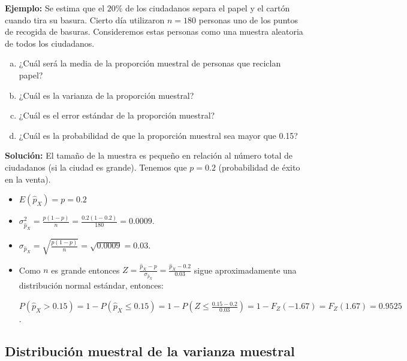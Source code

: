 \begin{frame}
     \textbf{Ejemplo:}
 Se estima que el $20\%$ de los
    ciudadanos  separa el papel y el cartón cuando tira su basura. Cierto día
    utilizaron $n=180$ personas  uno de los puntos de recogida de basuras. Consideremos  estas personas como
    una muestra aleatoria de todos los ciudadanos.
        \begin{enumerate}[a)]
        \item ¿Cuál será la media de la proporción muestral de personas
        que reciclan papel?
        \item ¿Cuál es la varianza de la proporción muestral?
        \item ¿Cuál es el error estándar de la proporción muestral?
        \item ¿Cuál es la probabilidad de que la proporción muestral sea
        mayor que 0.15?
        \end{enumerate}
\end{frame}

\begin{frame}
   \textbf{Solución:}
    El tamaño de la muestra es pequeño en relación al
    número total de ciudadanos (si la ciudad es grande). Tenemos que $p=0.2$ (probabilidad
    de éxito en la venta).
\begin{itemize}
  \item $E(\hat{p}_{X})=p=0.2$

  \item $\sigma_{\hat{p}_{X}}^2= \frac{ p(1-p)}{n}=\frac{0.2
    (1-0.2)}{180}=0.0009$.
  \item $\sigma_{\hat{p}_{X}}=\sqrt{\frac{ p(1-p)}{n}}=\sqrt{0.0009}=0.03$.
    \item Como $n$  es grande entonces
    $Z=\frac{\hat{p}_{X}-p}{\sigma_{\hat{p}_{X}}}=\frac{\hat{p}_{X}-0.2}{0.03}$
 sigue aproximadamente una distribución normal estándar, entonces:

 $P(\hat{p}_{X}>0.15)=1-P(\hat{p}_{X}\leq 0.15)= 1-P(Z\leq
 \frac{0.15-0.2}{0.03})=1-F_{Z}( -1.67)=F_{Z}(1.67)=0.9525$.
\end{itemize}
\end{frame}

    \subsection{Distribución muestral de la varianza muestral}

